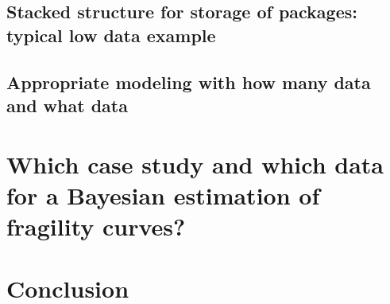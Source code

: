     \subsection{Stacked structure for storage of packages: typical low data example}


    \subsection{Appropriate modeling with how many data and what data}


\section{Which case study and which data for a Bayesian estimation of fragility curves?}


\section{Conclusion}





